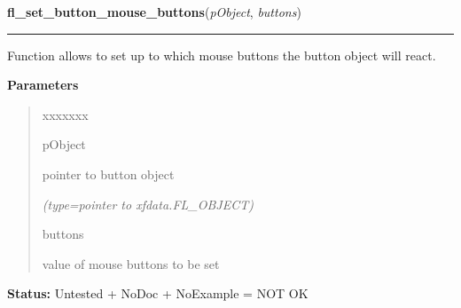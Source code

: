     \vspace{0.5ex}

\hspace{.8\funcindent}\begin{boxedminipage}{\funcwidth}

    \raggedright \textbf{fl\_set\_button\_mouse\_buttons}(\textit{pObject}, \textit{buttons})

    \vspace{-1.5ex}

    \rule{\textwidth}{0.5\fboxrule}
\setlength{\parskip}{2ex}
    Function allows to set up to which mouse buttons the button object will
    react.

\setlength{\parskip}{1ex}
      \textbf{Parameters}
      \vspace{-1ex}

      \begin{quote}
        \begin{Ventry}{xxxxxxx}

          \item[pObject]

          pointer to button object

            {\it (type=pointer to xfdata.FL\_OBJECT)}

          \item[buttons]

          value of mouse buttons to be set

        \end{Ventry}

      \end{quote}

\textbf{Status:} Untested + NoDoc + NoExample = NOT OK



    \end{boxedminipage}

    \label{xformslib:library:fl_get_button_mouse_buttons}

    \vspace{0.5ex}

